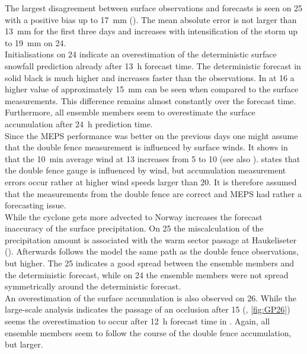The largest disagreement between surface observations and forecasts is seen on \SI{25}{\dec} with a positive bias up to \SI{17}{\mm} (). The mean absolute error is not larger than \SI{13}{\mm} for the first three days and increases with intensification of the storm up to \SI{19}{\mm} on \SI{24}{\dec}.
\\
Initialisations on \SI{24}{\dec} indicate an overestimation of the deterministic surface snowfall prediction already after \SI{13}{\hour} forecast time. The deterministic forecast in solid black is much higher and increases faster than the observations. In  at \SI{16}{\UTC} a higher value of approximately \SI{15}{\mm} can be seen when compared to the surface measurements. This difference remains almost constantly over the forecast time. Furthermore, all ensemble members seem to overestimate the surface accumulation after \SI{24}{\hour} prediction time. 
\\
Since the MEPS performance was better on the previous days one might assume that the double fence measurement is influenced by surface winds. It shows in  that the \SI{10}{\minute} average wind at \SI{13}{\UTC} increases from \SI{5}{\mPs} to \SI{10}{\mPs} (see also ). \citet{wolff_wmo_2018} states that the double fence gauge is influenced by wind, but accumulation measurement errors occur rather at higher wind speeds larger than \SI{20}{\mPs}. It is therefore assumed that the measurements from the double fence are correct and MEPS had rather a forecasting issue.
\\
While the cyclone gets more advected to Norway increases the forecast inaccuracy of the surface precipitation. 
On \SI{25}{\dec} the miscalculation of the precipitation amount is associated with the warm sector passage at Haukeliseter (). Afterwards follows the model the same path as the double fence observations, but higher. The \SI{25}{\dec} indicates a good spread between the ensemble members and the deterministic forecast, while on \SI{24}{\dec} the ensemble members were not spread symmetrically around the deterministic forecast. 
\\
An overestimation of the surface accumulation is also observed on \SI{26}{\dec}. While the large-scale analysis indicates the passage of an occlusion after \SI{15}{\UTC} (, \ref{fig:GP26}) seems the overestimation to occur after \SI{12}{\hour} forecast time in . Again, all ensemble members seem to follow the course of the double fence accumulation, but larger. 
